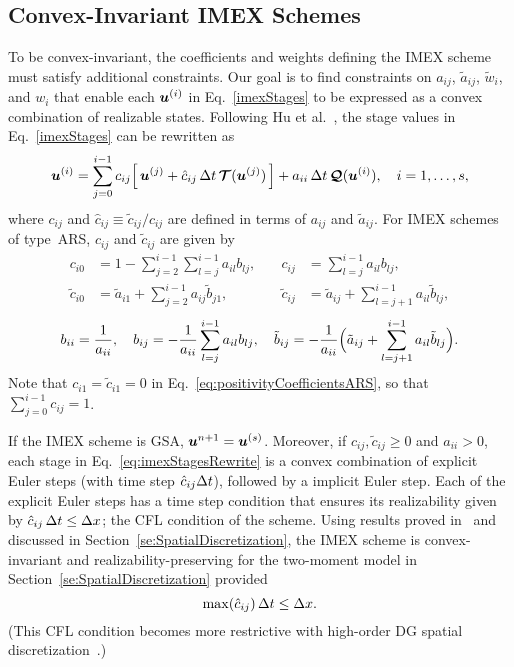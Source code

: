 \subsection{Convex-Invariant IMEX Schemes}

To be convex-invariant, the coefficients and weights defining the IMEX scheme must satisfy additional constraints.
Our goal is to find constraints on $a_{ij}$, $\tilde{a}_{ij}$, $\tilde{w}_{i}$, and $w_{i}$ that enable each $\boldsymbol{u}^{(i)}$ in Eq.~\eqref{imexStages} to be expressed as a convex combination of realizable states.  
Following Hu et al.~\cite{hu_etal_2018}, the stage values in Eq.~\eqref{imexStages} can be rewritten as
\begin{equation}
  \boldsymbol{u}^{(i)}
  =\sum_{j=0}^{i-1}c_{ij}\Big[\,\boldsymbol{u}^{(j)}+\hat{c}_{ij}\,\Delta t\,\boldsymbol{\mathcal{T}}(\boldsymbol{u}^{(j)})\,\Big] + a_{ii}\,\Delta t\,\boldsymbol{\mathcal{Q}}(\boldsymbol{u}^{(i)}),\quad i=1,\ldots,s,
  \label{eq:imexStagesRewrite}
\end{equation}
where $c_{ij}$ and $\hat{c}_{ij}\equiv\tilde{c}_{ij}/c_{ij}$ are defined in terms of $a_{ij}$ and $\tilde{a}_{ij}$.
For IMEX schemes of type~ARS, $c_{ij}$ and $\tilde{c}_{ij}$ are given by~\cite{hu_etal_2018}
    \begin{equation}
     \begin{aligned}
      c_{i0} &= 1-\sum_{j=2}^{i-1}\sum_{l=j}^{i-1}a_{il}b_{lj}, \quad &
      c_{ij} &= \sum_{l=j}^{i-1}a_{il}b_{lj}, \\
      \tilde{c}_{i0} &= \tilde{a}_{i1}+\sum_{j=2}^{i-1}a_{ij}\tilde{b}_{j1}, \quad &
      \tilde{c}_{ij} &= \tilde{a}_{ij}+\sum_{l=j+1}^{i-1}a_{il}\tilde{b}_{lj},  
     \end{aligned}
     \label{eq:positivityCoefficientsARS}
    \end{equation}
    \begin{equation}
      b_{ii} = \frac{1}{a_{ii}}, \quad
      b_{ij} = -\frac{1}{a_{ii}}\sum_{l=j}^{i-1}a_{il}b_{lj}, \quad
      \tilde{b}_{ij} = -\frac{1}{a_{ii}}\Big(\tilde{a}_{ij}+\sum_{l=j+1}^{i-1}a_{il}\tilde{b}_{lj}\Big).  
    \end{equation}
Note that $c_{i1}=\tilde{c}_{i1}=0$ in Eq.~\eqref{eq:positivityCoefficientsARS}, so that $\sum_{j=0}^{i-1}c_{ij}=1$.

If the IMEX scheme is GSA, $\boldsymbol{u}^{n+1} = \boldsymbol{u}^{(s)}$.  
Moreover, if $c_{ij},\tilde{c}_{ij}\ge0$ and $a_{ii}>0$, each stage in Eq.~\eqref{eq:imexStagesRewrite} is a convex combination of explicit Euler steps (with time step $\hat{c}_{ij}\Delta t$), followed by a implicit Euler step.  
Each of the explicit Euler steps has a time step condition that ensures its realizability given by $\hat{c}_{ij}\,\Delta t\leq\Delta x$; the CFL condition of the scheme.
Using results proved in~\cite{chu_etal_2018} and discussed in Section~\ref{se:SpatialDiscretization}, the IMEX scheme is convex-invariant and realizability-preserving for the two-moment model in Section~\ref{se:SpatialDiscretization} provided
\begin{equation}
  \max(\hat{c}_{ij})\,\Delta t \leq \Delta x.  
\end{equation}
(This CFL condition becomes more restrictive with high-order DG spatial discretization~\cite{chu_etal_2018}.)

